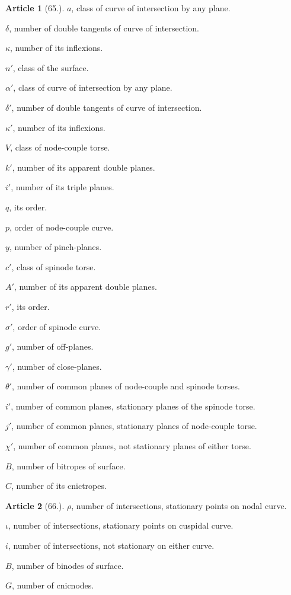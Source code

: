 \documentclass[11pt,a4paper]{article}
\theoremstyle{definition}
\newtheorem{art}{Article}
\begin{document}
\begin{art}[65.]
$a$, class of curve of intersection by any plane.

$\delta$, number of double tangents of curve of intersection.

$\kappa$, number of its inflexions.

$n'$, class of the surface.

$\alpha'$, class of curve of intersection by any plane.

$\delta'$, number of double tangents of curve of intersection.

$\kappa'$, number of its inflexions.

$V$, class of node-couple torse.

$k'$, number of its apparent double planes.

$i'$, number of its triple planes.

$q$, its order.

$p$, order of node-couple curve.

$y$, number of pinch-planes.

$c'$, class of spinode torse.

$A'$, number of its apparent double planes.

$r'$, its order.

$\sigma'$, order of spinode curve.

$g'$, number of off-planes.

$\gamma'$, number of close-planes.

$\theta'$, number of common planes of node-couple and spinode torses.

$i'$, number of common planes, stationary planes of the spinode torse.

$j'$, number of common planes, stationary planes of node-couple torse.

$\chi'$, number of common planes, not stationary planes of either torse.

$B$, number of bitropes of surface.

$C$, number of its cnictropes.
\end{art}

\begin{art}[66.]
$\rho$, number of intersections, stationary points on nodal curve.

$\iota$, number of intersections, stationary points on cuspidal curve.

$i$, number of intersections, not stationary on either curve.

$B$, number of binodes of surface.

$G$, number of cnicnodes.
\end{art}
\end{document}
